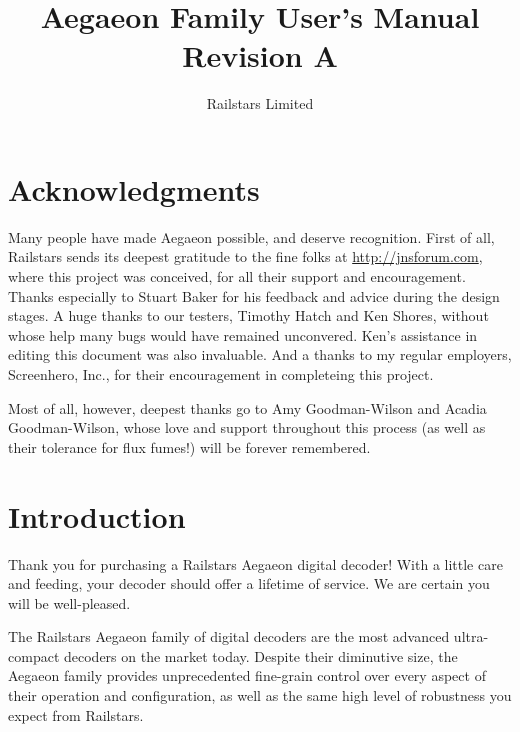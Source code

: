 \documentclass[12pt,letterpaper,draft]{memoir} %
\title{Aegaeon Family User's Manual\\Revision A}
\author{Railstars Limited}
\begin{document}
\maketitle
\newpage


\chapter*{Acknowledgments}

Many people have made Aegaeon possible, and deserve recognition. First of all, Railstars sends its deepest gratitude to the fine folks at \url{http://jnsforum.com}, where this project was conceived, for all their support and encouragement. Thanks especially to Stuart Baker for his feedback and advice during the design stages. A huge thanks to our testers, Timothy Hatch and Ken Shores, without whose help many bugs would have remained unconvered. Ken's assistance in editing this document was also invaluable. And a thanks to my regular employers, Screenhero, Inc., for their encouragement in completeing this project.

Most of all, however, deepest thanks go to Amy Goodman-Wilson and Acadia Goodman-Wilson, whose love and support throughout this process (as well as their tolerance for flux fumes!) will be forever remembered.
\newpage


\tableofcontents* %


\pagestyle{manual}
\chapter{Introduction}

Thank you for purchasing a Railstars Aegaeon digital decoder! With a little care and feeding, your decoder should offer a lifetime of service. We are certain you will be well-pleased.

The Railstars Aegaeon family of digital decoders are the most advanced ultra-compact decoders on the market today. Despite their diminutive size, the Aegaeon family provides unprecedented fine-grain control over every aspect of their operation and configuration, as well as the same high level of robustness you expect from Railstars.
\end{document}
